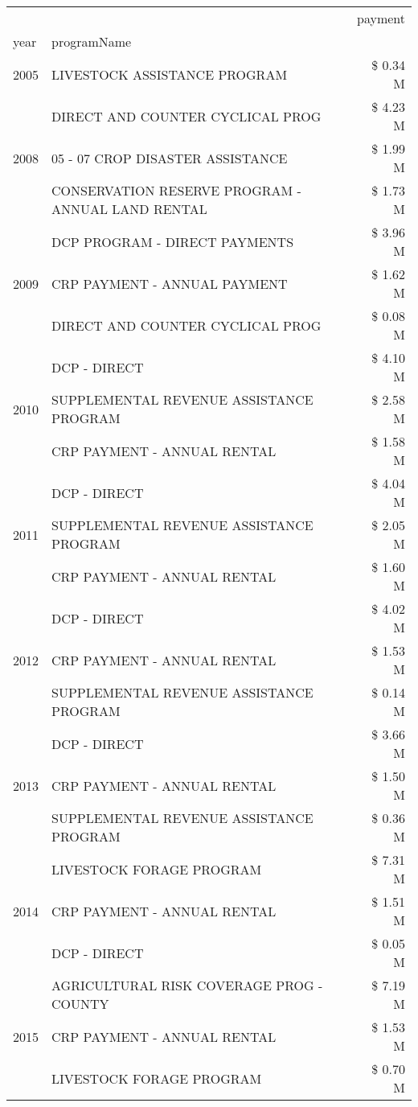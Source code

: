 \begin{tabular}{llr}
\toprule
 &  & payment \\
year & programName &  \\
\midrule
2005 & LIVESTOCK ASSISTANCE PROGRAM & \$ 0.34 M \\
\cline{1-3}
\multirow[t]{3}{*}{2008} & DIRECT AND COUNTER CYCLICAL PROG & \$ 4.23 M \\
 & 05 - 07 CROP DISASTER ASSISTANCE & \$ 1.99 M \\
 & CONSERVATION RESERVE PROGRAM - ANNUAL LAND RENTAL & \$ 1.73 M \\
\cline{1-3}
\multirow[t]{3}{*}{2009} & DCP PROGRAM - DIRECT PAYMENTS & \$ 3.96 M \\
 & CRP PAYMENT - ANNUAL PAYMENT & \$ 1.62 M \\
 & DIRECT AND COUNTER CYCLICAL PROG & \$ 0.08 M \\
\cline{1-3}
\multirow[t]{3}{*}{2010} & DCP - DIRECT & \$ 4.10 M \\
 & SUPPLEMENTAL REVENUE ASSISTANCE PROGRAM & \$ 2.58 M \\
 & CRP PAYMENT - ANNUAL RENTAL & \$ 1.58 M \\
\cline{1-3}
\multirow[t]{3}{*}{2011} & DCP - DIRECT & \$ 4.04 M \\
 & SUPPLEMENTAL REVENUE ASSISTANCE PROGRAM & \$ 2.05 M \\
 & CRP PAYMENT - ANNUAL RENTAL & \$ 1.60 M \\
\cline{1-3}
\multirow[t]{3}{*}{2012} & DCP - DIRECT & \$ 4.02 M \\
 & CRP PAYMENT - ANNUAL RENTAL & \$ 1.53 M \\
 & SUPPLEMENTAL REVENUE ASSISTANCE PROGRAM & \$ 0.14 M \\
\cline{1-3}
\multirow[t]{3}{*}{2013} & DCP - DIRECT & \$ 3.66 M \\
 & CRP PAYMENT - ANNUAL RENTAL & \$ 1.50 M \\
 & SUPPLEMENTAL REVENUE ASSISTANCE PROGRAM & \$ 0.36 M \\
\cline{1-3}
\multirow[t]{3}{*}{2014} & LIVESTOCK FORAGE PROGRAM & \$ 7.31 M \\
 & CRP PAYMENT - ANNUAL RENTAL & \$ 1.51 M \\
 & DCP - DIRECT & \$ 0.05 M \\
\cline{1-3}
\multirow[t]{3}{*}{2015} & AGRICULTURAL RISK COVERAGE PROG - COUNTY & \$ 7.19 M \\
 & CRP PAYMENT - ANNUAL RENTAL & \$ 1.53 M \\
 & LIVESTOCK FORAGE PROGRAM & \$ 0.70 M \\

\end{tabular}
